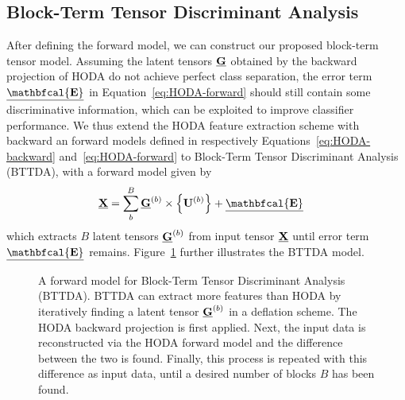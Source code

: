 \documentclass[twocolumn]{article}
\begin{document}
\subsection{Block-Term Tensor Discriminant Analysis}
After defining the forward model, we can construct our proposed block-term
tensor model. Assuming the latent tensors $\underline{\mathbf{G}}$
obtained by the backward projection of \textsc{HODA} do not achieve perfect
class separation, the error term $\ten{\mathbfcal{E}}$ in
Equation~\ref{eq:HODA-forward} should still contain some discriminative
information, which can be exploited to improve classifier performance.
We thus extend the \textsc{HODA} feature extraction scheme with backward an
forward models defined in respectively Equations~\ref{eq:HODA-backward}
and~\ref{eq:HODA-forward} to Block-Term Tensor Discriminant Analysis
(\textsc{BTTDA}), with a forward model given by
\begin{align}
	\ten{X} & = \sum_b^B\ten{G}^{(b)}\mmpr{\mat{U}^{(b)}} + \ten{\mathbfcal{E}}
	\label{eq:BTTDA-forward}
\end{align}
which extracts $B$ latent tensors $\underline{\mathbf{G}}^{(b)}$ from input tensor $\underline{\mathbf{X}}$
until error term $\ten{\mathbfcal{E}}$ remains.
Figure~\ref{fig:BTTDA} further illustrates the \textsc{BTTDA} model.
\begin{figure}[t]
	\centering
	
	\caption{A forward model for Block-Term Tensor Discriminant Analysis
		(\textsc{BTTDA}). \textsc{BTTDA} can extract more features
		than \textsc{HODA} by iteratively finding a latent tensor $\underline{\mathbf{G}}^{(b)}$ in a
		deflation scheme.
		The \textsc{HODA} backward projection is first applied. Next, the
		input data is reconstructed via the \textsc{HODA} forward model and the
		difference between the two is found.
		Finally, this process is repeated with this difference as input data, until a
		desired number of blocks $B$ has been found.}
	\label{fig:BTTDA}
\end{figure}
\end{document}
